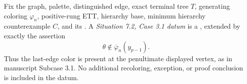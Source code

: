 \begin{definition}
Fix the graph, palette, distinguished edge, exact terminal tree \(T\),
generating coloring \(\varphi_n\), positive-rung ETT, hierarchy base,
minimum hierarchy counterexample \(C\), and its
.  A
\emph{Situation 7.2, Case 3.1 datum} is a
, extended by
exactly the assertion
\[
 \theta\notin\overline\varphi_n(y_{p-1}).
\]
Thus the last-edge color is present at the penultimate displayed vertex,
as in manuscript Subcase 3.1.  No additional recoloring, exception, or
proof conclusion is included in the datum.
\end{definition}
